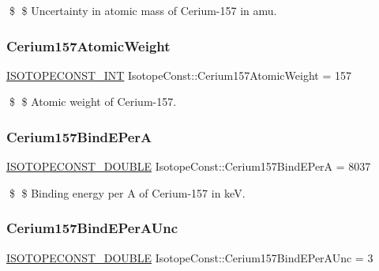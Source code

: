 \$ \$ Uncertainty in atomic mass of Cerium-\/157 in amu. \mbox{\label{group___isotope_const-_cerium-_ce157_ga40361bea0ac02453a39278d86c7532cb}} 
\subsubsection{\texorpdfstring{Cerium157\+Atomic\+Weight}{Cerium157AtomicWeight}}
{\footnotesize\ttfamily \mbox{\hyperlink{group___isotope_const-_macros_ga5f18360b3e99483a35c32d789e62621c}{I\+S\+O\+T\+O\+P\+E\+C\+O\+N\+S\+T\+\_\+\+I\+NT}} Isotope\+Const\+::\+Cerium157\+Atomic\+Weight = 157}

\$ \$ Atomic weight of Cerium-\/157. \mbox{\label{group___isotope_const-_cerium-_ce157_ga669d1912b92bb758a2421499354d0164}} 
\subsubsection{\texorpdfstring{Cerium157\+Bind\+E\+PerA}{Cerium157BindEPerA}}
{\footnotesize\ttfamily \mbox{\hyperlink{group___isotope_const-_macros_ga8f45a7272ce02c0b4c65c44636ed719a}{I\+S\+O\+T\+O\+P\+E\+C\+O\+N\+S\+T\+\_\+\+D\+O\+U\+B\+LE}} Isotope\+Const\+::\+Cerium157\+Bind\+E\+PerA = 8037}

\$ \$ Binding energy per A of Cerium-\/157 in keV. \mbox{\label{group___isotope_const-_cerium-_ce157_gac48a05803f7a9a77c118647c5307a1be}} 
\subsubsection{\texorpdfstring{Cerium157\+Bind\+E\+Per\+A\+Unc}{Cerium157BindEPerAUnc}}
{\footnotesize\ttfamily \mbox{\hyperlink{group___isotope_const-_macros_ga8f45a7272ce02c0b4c65c44636ed719a}{I\+S\+O\+T\+O\+P\+E\+C\+O\+N\+S\+T\+\_\+\+D\+O\+U\+B\+LE}} Isotope\+Const\+::\+Cerium157\+Bind\+E\+Per\+A\+Unc = 3}

